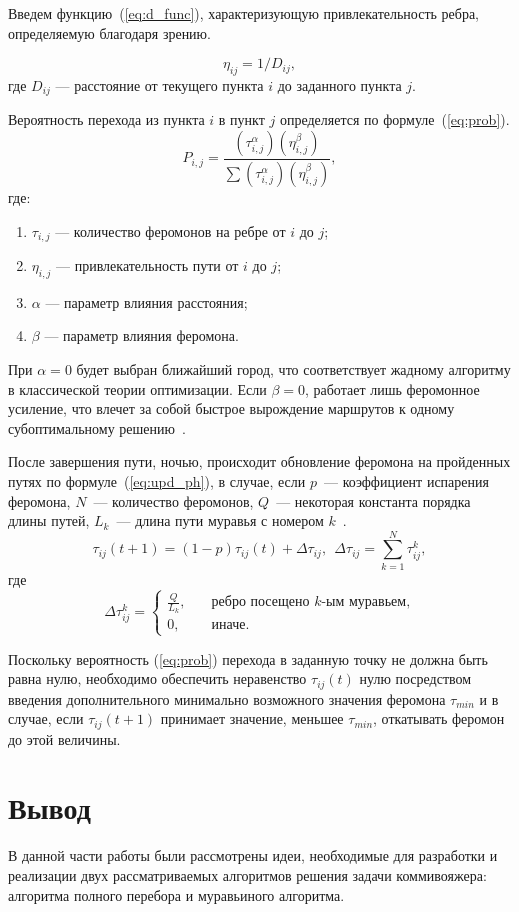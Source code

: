 Введем функцию~(\ref{eq:d_func}), характеризующую привлекательность ребра, определяемую благодаря зрению.

\begin{equation}
	\label{eq:d_func}
	\eta_{ij} = 1 / D_{ij},
\end{equation}
где $D_{ij}$ — расстояние от текущего пункта $i$ до заданного пункта $j$.

Вероятность перехода из пункта $i$ в пункт $j$ определяется по формуле~(\ref{eq:prob}).
\begin{equation}
	\label{eq:prob}
	P_{i,j}={\frac {(\tau_{i,j}^{\alpha})(\eta_{i,j}^{\beta })}{\sum (\tau_{i,j}^{\alpha})(\eta_{i,j}^{\beta})}},
\end{equation}
где:
\begin{enumerate}
	\item $\tau_{i,j}$ --- количество феромонов на ребре от $i$ до $j$;
	\item $\eta_{i,j}$ --- привлекательность пути от $i$ до $j$;
	\item $\alpha$ --- параметр влияния расстояния;
	\item $\beta$ --- параметр влияния феромона.
\end{enumerate}

При $\alpha = 0$ будет выбран ближайший город, что соответствует жадному алгоритму в классической теории оптимизации. Если $\beta=0$, работает лишь феромонное усиление, что влечет за собой быстрое вырождение маршрутов к одному субоптимальному решению~\cite{shtovba}.

После завершения пути, ночью, происходит обновление феромона на пройденных путях по формуле~(\ref{eq:upd_ph}), в случае, если $p$~--- коэффициент испарения феромона, $N$~--- количество феромонов, $Q$~--- некоторая константа порядка длины путей, $L_{k}$~--- длина пути муравья с номером $k$~\cite{shtovba}.
\begin{equation}\label{eq:upd_ph}
	\tau_{ij}(t+1) = (1-p)\tau_{ij}(t) + \Delta \tau_{ij},~~\Delta \tau_{ij} =
	\displaystyle\sum_{k=1}^N \tau^k_{ij},
\end{equation}
где
\begin{equation}\label{eq:3}
	\Delta \tau^k_{ij} = \begin{cases}
		\frac{Q}{L_k}, & \quad \textrm{ребро посещено $k$-ым муравьем,} \\
		0, & \quad \textrm{иначе.}
	\end{cases}
\end{equation}

Поскольку вероятность (\ref{eq:prob}) перехода в заданную точку не должна быть равна нулю, необходимо обеспечить неравенство $\tau_{ij} (t)$ нулю посредством введения дополнительного минимально возможного значения феромона $\tau_{min}$ и в случае, если $\tau_{ij} (t+1)$ принимает значение, меньшее $\tau_{min}$, откатывать феромон до этой величины.

\section*{Вывод}
В данной части работы были рассмотрены идеи, необходимые для разработки и реализации двух рассматриваемых алгоритмов решения задачи коммивояжера: алгоритма полного перебора и муравьиного алгоритма.
